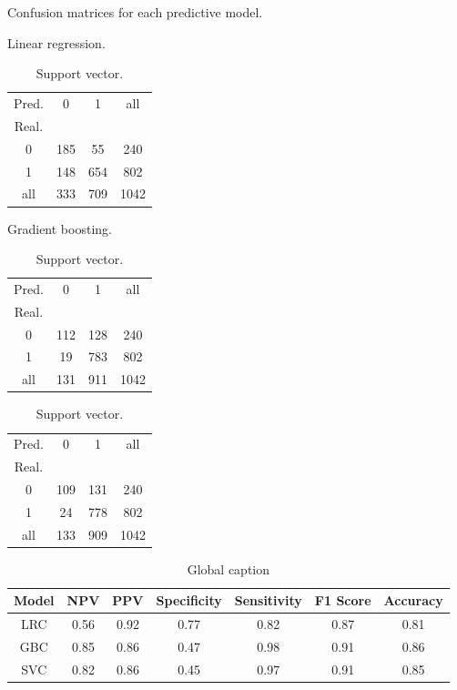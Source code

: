 \documentclass[twoside,11pt]{article}
\begin{document}
\begin{table}[!htb]
    \caption{Confusion matrices for each predictive model.}
    \begin{subtable}{.33\linewidth}
      \centering
        \caption{Linear regression.}
        \begin{tabular}{|c|cc|c|}
            \hline
            Pred. & 0 & 1 & all \\
            Real. & & & \\
            \hline
            0 & 185 & 55 & 240\\
            1 & 148 & 654 & 802\\
            \hline
            all & 333 & 709 & 1042\\
            \hline
        \end{tabular}
    \end{subtable}%
    \begin{subtable}{.33\linewidth}
      \centering
        \caption{Gradient boosting.}
        \begin{tabular}{|c|cc|c|}
            \hline
            Pred. & 0 & 1 & all \\
            Real. & & & \\
            \hline
            0 & 112 & 128 & 240\\
            1 & 19 & 783 & 802\\
            \hline
            all & 131 & 911 & 1042\\
            \hline
        \end{tabular}
    \end{subtable}%
    \begin{subtable}{.33\linewidth}
        \centering
          \caption{Support vector.}
          \begin{tabular}{|c|cc|c|}
            \hline
            Pred. & 0 & 1 & all \\
            Real. & & & \\
            \hline
            0 & 109 & 131 & 240\\
            1 & 24 & 778 & 802\\
            \hline
            all & 133 & 909 & 1042\\
            \hline
        \end{tabular}
      \end{subtable} 
\end{table}

\begin{table}[!htb]
    \caption{Global caption}
    \centering
    \begin{tabular}{|c|c|c|c|c|c|c|}
        \hline
        Model & NPV & PPV & Specificity & Sensitivity & F1 Score & Accuracy \\
        \hline
        LRC & 0.56 & 0.92 & 0.77 & 0.82 & 0.87 & 0.81 \\
        GBC & 0.85 & 0.86 & 0.47 & 0.98 & 0.91 & 0.86 \\
        SVC & 0.82 & 0.86 & 0.45 & 0.97 & 0.91 & 0.85 \\
        \hline
    \end{tabular}
\end{table}
\end{document}
